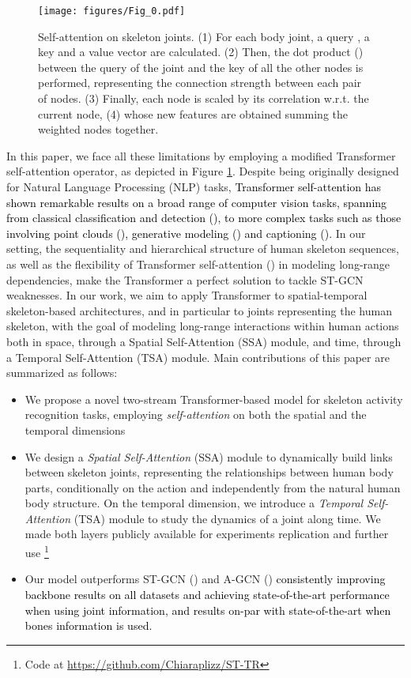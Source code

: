 \documentclass[times,twocolumn,final,authoryear]{elsarticle}
\DeclareRobustCommand{\new}[1]
{{\textcolor{black}{#1}}}
\begin{document}
 \begin{figure}[t]
    \centering
    \texttt{[image: figures/Fig\_0.pdf]}
    \caption{{Self-attention on skeleton joints}. (1) For each body joint, a query , a key  and a value vector  are calculated. (2) Then, the dot product () between the query of the joint and the key of all the other nodes is performed, representing the connection strength between each pair of nodes. (3) Finally, each node is scaled by its correlation w.r.t. the current node, (4) whose new features are obtained summing the weighted nodes together. 
    }
    \label{fig0}
\end{figure}

In this paper, we face all these limitations by employing a modified Transformer self-attention operator, as depicted in Figure \ref{fig0}. Despite being originally designed for Natural Language Processing (NLP) tasks, \new{Transformer self-attention has shown remarkable results on a broad range of computer vision tasks, spanning from classical classification and detection (\cite{dosovitskiy2020image,Bello_2019_ICCV,non-local,carion2020end}), to more complex tasks such as those involving point clouds (\cite{zhao2020point}), generative modeling (\cite{oord2016conditional,parmar2018image}) and captioning (\cite{he2020image}).}
In our setting, the sequentiality and hierarchical structure of human skeleton sequences, as well as the flexibility of Transformer self-attention (\cite{attention}) in modeling long-range dependencies, make the Transformer a perfect solution to tackle ST-GCN weaknesses. In our work, we aim to apply Transformer to spatial-temporal skeleton-based architectures, and in particular to joints representing the human skeleton, with the goal of modeling long-range interactions within human actions both in space, through a Spatial Self-Attention (SSA) module, and time, through a Temporal Self-Attention (TSA) module.
Main contributions of this paper are summarized as follows: 
\begin{itemize}
    \item We propose a novel two-stream Transformer-based model for skeleton activity recognition tasks, employing \textit{self-attention} on both the spatial and the temporal dimensions
    \item We design a \textit{Spatial Self-Attention} (SSA) module to dynamically build links between skeleton joints, representing the relationships between human body parts, conditionally on the action and independently from the natural human body structure. On the temporal dimension, we introduce a  \textit{Temporal Self-Attention} (TSA) module to study the dynamics of a joint along time. We made both layers publicly available for experiments replication and further use \footnote{Code at \color{magenta}\url{https://github.com/Chiaraplizz/ST-TR}}
\item Our model outperforms ST-GCN (\cite{yan2018spatial}) and A-GCN (\cite{Shi2018TwoStreamAG}) \new{consistently improving backbone results on all datasets and achieving state-of-the-art performance when using joint information, and results on-par with state-of-the-art when bones information is used.} 

\end{itemize}
\end{document}
